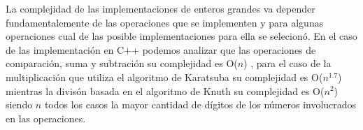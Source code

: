 La complejidad de las implementaciones de enteros grandes va depender fundamentalemente de las operaciones que se implementen y para algunas operaciones cual de las posible implementaciones para ella se selecionó. En el caso de las implementación en C++ podemos analizar que las operaciones de comparación, suma y subtración su complejidad es O($n$) , para el caso de la multiplicación que utiliza el algoritmo de Karatsuba su complejidad es O($n^1.7$) mientras la divisón basada en el algoritmo de Knuth su complejidad es O($n^2$) siendo $n$ todos los casos la mayor cantidad de dígitos de los números involucrados en las operaciones.  